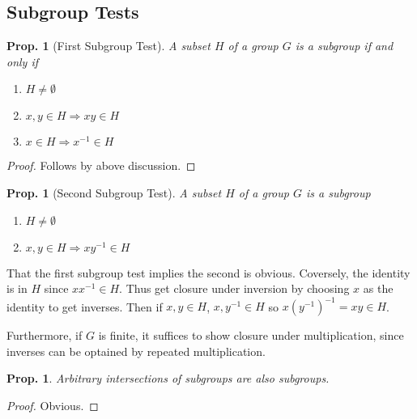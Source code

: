 \documentclass[12pt, a4paper]{book}
\newtheorem{proposition}[theorem]{Prop.}
\theoremstyle{nonumberplain}
\newtheorem{proof}{Proof}
\begin{document}
\subsection{Subgroup Tests}
\begin{proposition}[First Subgroup Test]
    A subset $H$ of a group $G$ is a subgroup if and only if
    \begin{enumerate}
        \item $H\neq\emptyset$
        \item $x,y\in H\Rightarrow xy\in H$
        \item $x\in H\Rightarrow x^{-1}\in H$
    \end{enumerate}
\end{proposition}
\begin{proof}
    Follows by above discussion.
\end{proof}
\begin{proposition}[Second Subgroup Test]
    A subset $H$ of a group $G$ is a subgroup
    \begin{enumerate}
        \item $H\neq\emptyset$
        \item $x,y\in H\Rightarrow xy^{-1}\in H$
    \end{enumerate}
\end{proposition}
That the first subgroup test implies the second is obvious.
Coversely, the identity is in $H$ since $xx^{-1}\in H$.
Thus get closure under inversion by choosing $x$ as the identity to get inverses.
Then if $x,y\in H$, $x,y^{-1}\in H$ so $x(y^{-1})^{-1}=xy\in H$.

Furthermore, if $G$ is finite, it suffices to show closure under multiplication, since inverses can be optained by repeated multiplication.
\begin{proposition}
    Arbitrary intersections of subgroups are also subgroups.
\end{proposition}
\begin{proof}
    Obvious.
\end{proof}
\end{document}
